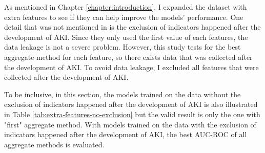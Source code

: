 \documentclass[../main.tex]{subfiles}
\begin{document}
As mentioned in Chapter \ref{chapter:introduction}, I expanded the dataset with extra features to see if they can help improve the models' performance.
One detail that was not mentioned in  is the exclusion of indicators happened after the development of AKI.
Since they only used the first value of each features, the data leakage is not a severe problem.
However, this study tests for the best aggregate method for each feature, so there exists data that was collected after the development of AKI.
To avoid data leakage, I excluded all features that were collected after the development of AKI.

To be inclusive, in this section, the models trained on the data without the exclusion of indicators happened after the development of \gls{AKI} is also illustrated in Table \ref{tab:extra-features-no-exclusion} but the valid result is only the one with "first" aggregate method.
With models trained on the data with the exclusion of indicators happened after the development of AKI, the best AUC-ROC of all aggregate methods is evaluated.
\end{document}
